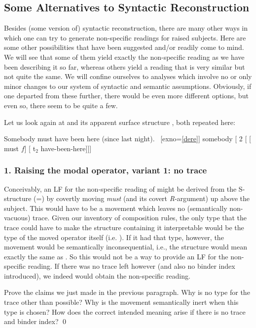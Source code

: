\subsection{Some Alternatives to Syntactic Reconstruction}\label{sem}

Besides (some version of) syntactic reconstruction, there are many other ways in
which one can try to generate non-specific readings for raised subjects. Here
are some other possibilities that have been suggested and/or readily come to
mind. We will see that some of them yield exactly the non-specific reading as we
have been describing it so far, whereas others yield a reading that is very
similar but not quite the same. We will confine ourselves to analyses which
involve no or only minor changes to our system of syntactic and semantic
assumptions. Obviously, if one departed from these further, there would be even
more different options, but even so, there seem to be quite a few.

Let us look again at  and its apparent surface structure ,
both repeated here:

\ex[exno=\ref{some}] Somebody must have been here (since last night).\xe
\ex~[exno=\ref{dere}] somebody [ 2 [ [ must $f$] [ t$_2$ have-been-here]]] \xe

\subsubsection{1. Raising the modal operator, variant 1: no trace}

Conceivably, an LF for the non-specific reading of  might be derived
from the S-structure (=) by covertly moving \emph{must} (and its
covert \emph{R}-argument) up above the subject. This would have to be a movement
which leaves no (semantically non-vacuous) trace. Given our inventory of
composition rules, the only type that the trace could have to make the structure
containing it interpretable would be the type of the moved operator itself (i.e.
). If it had that type, however, the movement would be semantically
inconsequential, i.e., the structure would mean exactly the same as .
So this would not be a way to provide an LF for the non-specific reading. If
there was no trace left however (and also no binder index introduced), we indeed
would obtain the non-specific reading.
\begin{exercise}
	Prove the claims we just made in the previous paragraph. Why is no type for
  the trace other than  possible? Why is the movement semantically
  inert when this type is chosen? How does the correct intended meaning arise if
  there is no trace and binder index? \qed
\end{exercise}

